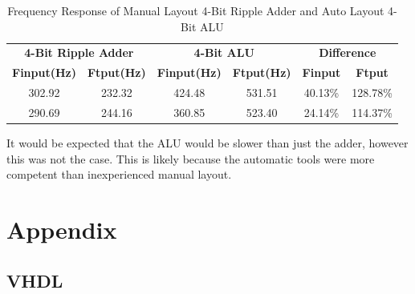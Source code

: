\documentclass[11pt]{article}
\begin{document}
	\begin{table}[H]
		\centering
		\caption{Frequency Response of Manual Layout 4-Bit Ripple Adder and Auto Layout 4-Bit ALU}
		\label{tab:Question-Freq}
		\begin{tabular}{|cc|cc|cc|}
			\hline
			\multicolumn{2}{|c}{\textbf{4-Bit Ripple Adder}}          & \multicolumn{2}{|c|}{\textbf{4-Bit ALU}}                   & \multicolumn{2}{c|}{\textbf{Difference}}        \\
			\textbf{Finput(Hz)} & \textbf{Ftput(Hz)} & \textbf{Finput(Hz)} & \textbf{Ftput(Hz)} & \textbf{Finput} & \textbf{Ftput} \\
			\hline
			302.92                   & 232.32                        & 424.48                   & 531.51                        & 40.13\%             & 128.78\%                 \\
			290.69                   & 244.16                        & 360.85                   & 523.40                        & 24.14\%             & 114.37\%                 \\
			\hline
		\end{tabular}
	\end{table}

	It would be expected that the ALU would be slower than just the adder, however this was not the case. This is likely because the automatic tools were more competent than inexperienced manual layout. 

\section{Appendix}

	\subsection{VHDL}
	
\end{document}
